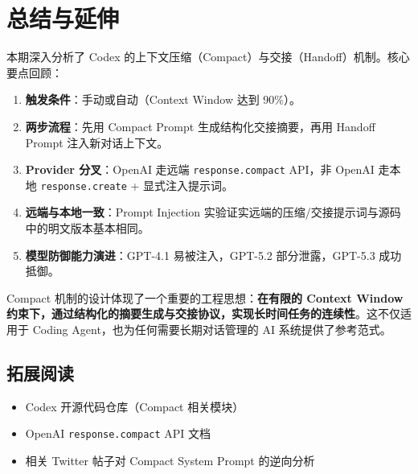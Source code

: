 \section{总结与延伸}

本期深入分析了 Codex 的上下文压缩（Compact）与交接（Handoff）机制。核心要点回顾：

\begin{enumerate}
    \item \textbf{触发条件}：手动或自动（Context Window 达到 90\%）。
    \item \textbf{两步流程}：先用 Compact Prompt 生成结构化交接摘要，再用 Handoff Prompt 注入新对话上下文。
    \item \textbf{Provider 分叉}：OpenAI 走远端 \texttt{response.compact} API，非 OpenAI 走本地 \texttt{response.create} + 显式注入提示词。
    \item \textbf{远端与本地一致}：Prompt Injection 实验证实远端的压缩/交接提示词与源码中的明文版本基本相同。
    \item \textbf{模型防御能力演进}：GPT-4.1 易被注入，GPT-5.2 部分泄露，GPT-5.3 成功抵御。
\end{enumerate}

Compact 机制的设计体现了一个重要的工程思想：\textbf{在有限的 Context Window 约束下，通过结构化的摘要生成与交接协议，实现长时间任务的连续性}。这不仅适用于 Coding Agent，也为任何需要长期对话管理的 AI 系统提供了参考范式。

\subsection{拓展阅读}

\begin{itemize}
    \item Codex 开源代码仓库（Compact 相关模块）
    \item OpenAI \texttt{response.compact} API 文档
    \item 相关 Twitter 帖子对 Compact System Prompt 的逆向分析
\end{itemize}



